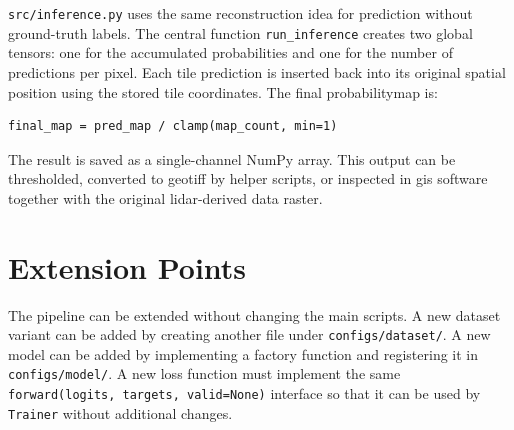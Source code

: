 \begin{sloppypar}
\texttt{src/inference.py} uses the same reconstruction idea for prediction without ground-truth labels. The central function \texttt{run\_inference} creates two global tensors: one for the accumulated probabilities and one for the number of predictions per pixel. Each tile prediction is inserted back into its original spatial position using the stored tile coordinates. The final \gls{probabilitymap} is:

\begin{verbatim}
final_map = pred_map / clamp(map_count, min=1)
\end{verbatim}

The result is saved as a single-channel NumPy array. This output can be thresholded, converted to \gls{geotiff} by helper scripts, or inspected in \gls{gis} software together with the original \gls{lidar}-derived data raster.

\section{Extension Points}

The pipeline can be extended without changing the main scripts. A new dataset variant can be added by creating another file under \texttt{configs/dataset/}. A new model can be added by implementing a factory function and registering it in \texttt{configs/model/}. A new loss function must implement the same \texttt{forward(logits, targets, valid=None)} interface so that it can be used by \texttt{Trainer} without additional changes.

\end{sloppypar}
